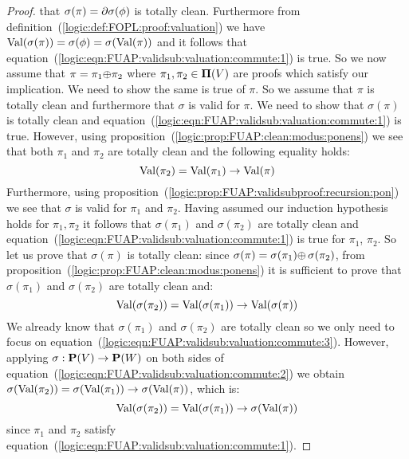 \begin{proof}
that $\sigma(\pi)=\mbox{$\partial$}\sigma(\phi)$ is totally clean. Furthermore
from definition~(\ref{logic:def:FOPL:proof:valuation}) we have
$\mbox{\rm Val}(\sigma(\pi))=\sigma(\phi)=\sigma(\mbox{\rm Val}(\pi))$ and it follows
that equation~(\ref{logic:eqn:FUAP:validsub:valuation:commute:1}) is
true. So we now assume that $\pi=\pi_{1}\mbox{$\oplus$}\pi_{2}$ where
$\pi_{1},\pi_{2}\in\mbox{${\bf\Pi}(V)$}$ are proofs which satisfy our implication.
We need to show the same is true of $\pi$. So we assume that $\pi$
is totally clean and furthermore that $\sigma$ is valid for $\pi$.
We need to show that $\sigma(\pi)$ is totally clean and
equation~(\ref{logic:eqn:FUAP:validsub:valuation:commute:1}) is
true. However, using
proposition~(\ref{logic:prop:FUAP:clean:modus:ponens}) we see that
both $\pi_{1}$ and $\pi_{2}$ are totally clean and the following
equality holds:
    \begin{equation}\label{logic:eqn:FUAP:validsub:valuation:commute:2}
    \mbox{\rm Val}(\pi_{2})=\mbox{\rm Val}(\pi_{1})\to\mbox{\rm Val}(\pi)
    \end{equation}
Furthermore, using
proposition~(\ref{logic:prop:FUAP:validsubproof:recursion:pon}) we
see that $\sigma$ is valid for $\pi_{1}$ and $\pi_{2}$. Having
assumed our induction hypothesis holds for $\pi_{1},\pi_{2}$ it
follows that $\sigma(\pi_{1})$ and $\sigma(\pi_{2})$ are totally
clean and
equation~(\ref{logic:eqn:FUAP:validsub:valuation:commute:1}) is true
for $\pi_{1}$, $\pi_{2}$. So let us prove that $\sigma(\pi)$ is
totally clean: since
$\sigma(\pi)=\sigma(\pi_{1})\mbox{$\oplus$}\,\sigma(\pi_{2})$, from
proposition~(\ref{logic:prop:FUAP:clean:modus:ponens}) it is
sufficient to prove that $\sigma(\pi_{1})$ and $\sigma(\pi_{2})$ are
totally clean and:
    \begin{equation}\label{logic:eqn:FUAP:validsub:valuation:commute:3}
    \mbox{\rm Val}(\sigma(\pi_{2}))=\mbox{\rm Val}(\sigma(\pi_{1}))\to\mbox{\rm Val}(\sigma(\pi))
    \end{equation}
We already know that $\sigma(\pi_{1})$ and $\sigma(\pi_{2})$ are
totally clean so we only need to focus on
equation~(\ref{logic:eqn:FUAP:validsub:valuation:commute:3}).
However, applying $\sigma:\mbox{${\bf P}(V)$}\to{\bf P}(W)$ on both sides of
equation~(\ref{logic:eqn:FUAP:validsub:valuation:commute:2}) we
obtain
$\sigma(\mbox{\rm Val}(\pi_{2}))=\sigma(\mbox{\rm Val}(\pi_{1}))\to\sigma(\mbox{\rm Val}(\pi))$,
which is:
    \begin{equation}\label{logic:eqn:FUAP:validsub:valuation:commute:4}
    \mbox{\rm Val}(\sigma(\pi_{2}))=\mbox{\rm Val}(\sigma(\pi_{1}))\to\sigma(\mbox{\rm Val}(\pi))
    \end{equation}
since $\pi_{1}$ and $\pi_{2}$ satisfy
equation~(\ref{logic:eqn:FUAP:validsub:valuation:commute:1}).

\end{proof}

